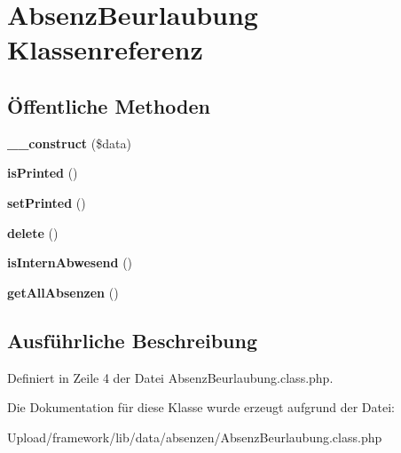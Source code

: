 \hypertarget{class_absenz_beurlaubung}{}\section{Absenz\+Beurlaubung Klassenreferenz}
\label{class_absenz_beurlaubung}
\subsection*{Öffentliche Methoden}
\begin{DoxyCompactItemize}
\item 
\mbox{\label{class_absenz_beurlaubung_a4a9bd25cc32f76341a4ec6c68cfca868}} 
{\bfseries \+\_\+\+\_\+construct} (\$data)
\item 
\mbox{\label{class_absenz_beurlaubung_abeddf8a2e249cd0474769fb093fb15e8}} 
{\bfseries is\+Printed} ()
\item 
\mbox{\label{class_absenz_beurlaubung_afbff1b9ba1f2d60bd781ec6e1ec88c8d}} 
{\bfseries set\+Printed} ()
\item 
\mbox{\label{class_absenz_beurlaubung_a33e09a54a93ef352b2d2336c463b9073}} 
{\bfseries delete} ()
\item 
\mbox{\label{class_absenz_beurlaubung_a4c4b2e4e6eed878c56305f3e2150f9ab}} 
{\bfseries is\+Intern\+Abwesend} ()
\item 
\mbox{\label{class_absenz_beurlaubung_af738c6fb894a93528bc52e548dcb2e07}} 
{\bfseries get\+All\+Absenzen} ()
\end{DoxyCompactItemize}


\subsection{Ausführliche Beschreibung}


Definiert in Zeile 4 der Datei Absenz\+Beurlaubung.\+class.\+php.



Die Dokumentation für diese Klasse wurde erzeugt aufgrund der Datei\+:\begin{DoxyCompactItemize}
\item 
Upload/framework/lib/data/absenzen/Absenz\+Beurlaubung.\+class.\+php\end{DoxyCompactItemize}
